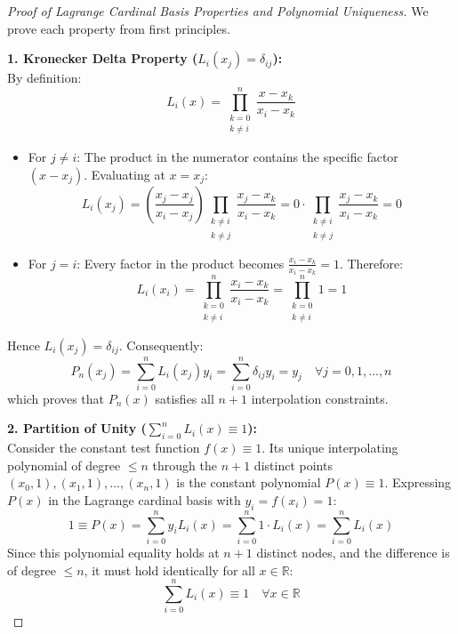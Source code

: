 \begin{proof}[Proof of Lagrange Cardinal Basis Properties and Polynomial Uniqueness]
We prove each property from first principles.

\medskip
\noindent\textbf{1. Kronecker Delta Property ($L_i(x_j) = \delta_{ij}$):} \\
By definition:
\begin{equation}
    L_i(x) = \prod_{\substack{k=0 \\ k \ne i}}^n \frac{x - x_k}{x_i - x_k}
\end{equation}
\begin{itemize}
    \item For $j \ne i$: The product in the numerator contains the specific factor $(x - x_j)$. Evaluating at $x = x_j$:
    \begin{equation}
        L_i(x_j) = \left( \frac{x_j - x_j}{x_i - x_j} \right) \prod_{\substack{k \ne i \\ k \ne j}} \frac{x_j - x_k}{x_i - x_k} = 0 \cdot \prod_{\substack{k \ne i \\ k \ne j}} \frac{x_j - x_k}{x_i - x_k} = 0
    \end{equation}
    \item For $j = i$: Every factor in the product becomes $\frac{x_i - x_k}{x_i - x_k} = 1$. Therefore:
    \begin{equation}
        L_i(x_i) = \prod_{\substack{k=0 \\ k \ne i}}^n \frac{x_i - x_k}{x_i - x_k} = \prod_{\substack{k=0 \\ k \ne i}}^n 1 = 1
    \end{equation}
\end{itemize}
Hence $L_i(x_j) = \delta_{ij}$. Consequently:
\begin{equation}
    P_n(x_j) = \sum_{i=0}^n L_i(x_j) y_i = \sum_{i=0}^n \delta_{ij} y_i = y_j \quad \forall j = 0, 1, \dots, n
\end{equation}
which proves that $P_n(x)$ satisfies all $n+1$ interpolation constraints.

\medskip
\noindent\textbf{2. Partition of Unity ($\sum_{i=0}^n L_i(x) \equiv 1$):} \\
Consider the constant test function $f(x) \equiv 1$. Its unique interpolating polynomial of degree $\le n$ through the $n+1$ distinct points $(x_0, 1), (x_1, 1), \dots, (x_n, 1)$ is the constant polynomial $P(x) \equiv 1$.
Expressing $P(x)$ in the Lagrange cardinal basis with $y_i = f(x_i) = 1$:
\begin{equation}
    1 \equiv P(x) = \sum_{i=0}^n y_i L_i(x) = \sum_{i=0}^n 1 \cdot L_i(x) = \sum_{i=0}^n L_i(x)
\end{equation}
Since this polynomial equality holds at $n+1$ distinct nodes, and the difference is of degree $\le n$, it must hold identically for all $x \in \mathbb{R}$:
\begin{equation}
    \boxed{\sum_{i=0}^n L_i(x) \equiv 1 \quad \forall x \in \mathbb{R}}
\end{equation}


\end{proof}
